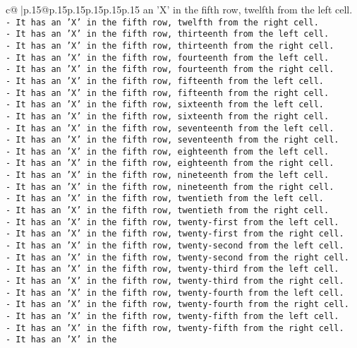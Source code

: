 \documentclass{article}
\begin{document}
{\begin{supertabular}{c@{$\;$}|p{.15\linewidth}@{}p{.15\linewidth}p{.15\linewidth}p{.15\linewidth}p{.15\linewidth}p{.15\linewidth}}
{{{an 'X' in the fifth row, twelfth from the left cell.\\ \tt - It has an 'X' in the fifth row, twelfth from the right cell.\\ \tt - It has an 'X' in the fifth row, thirteenth from the left cell.\\ \tt - It has an 'X' in the fifth row, thirteenth from the right cell.\\ \tt - It has an 'X' in the fifth row, fourteenth from the left cell.\\ \tt - It has an 'X' in the fifth row, fourteenth from the right cell.\\ \tt - It has an 'X' in the fifth row, fifteenth from the left cell.\\ \tt - It has an 'X' in the fifth row, fifteenth from the right cell.\\ \tt - It has an 'X' in the fifth row, sixteenth from the left cell.\\ \tt - It has an 'X' in the fifth row, sixteenth from the right cell.\\ \tt - It has an 'X' in the fifth row, seventeenth from the left cell.\\ \tt - It has an 'X' in the fifth row, seventeenth from the right cell.\\ \tt - It has an 'X' in the fifth row, eighteenth from the left cell.\\ \tt - It has an 'X' in the fifth row, eighteenth from the right cell.\\ \tt - It has an 'X' in the fifth row, nineteenth from the left cell.\\ \tt - It has an 'X' in the fifth row, nineteenth from the right cell.\\ \tt - It has an 'X' in the fifth row, twentieth from the left cell.\\ \tt - It has an 'X' in the fifth row, twentieth from the right cell.\\ \tt - It has an 'X' in the fifth row, twenty-first from the left cell.\\ \tt - It has an 'X' in the fifth row, twenty-first from the right cell.\\ \tt - It has an 'X' in the fifth row, twenty-second from the left cell.\\ \tt - It has an 'X' in the fifth row, twenty-second from the right cell.\\ \tt - It has an 'X' in the fifth row, twenty-third from the left cell.\\ \tt - It has an 'X' in the fifth row, twenty-third from the right cell.\\ \tt - It has an 'X' in the fifth row, twenty-fourth from the left cell.\\ \tt - It has an 'X' in the fifth row, twenty-fourth from the right cell.\\ \tt - It has an 'X' in the fifth row, twenty-fifth from the left cell.\\ \tt - It has an 'X' in the fifth row, twenty-fifth from the right cell.\\ \tt - It has an 'X' in the }}}
\end{supertabular}}
\end{document}
